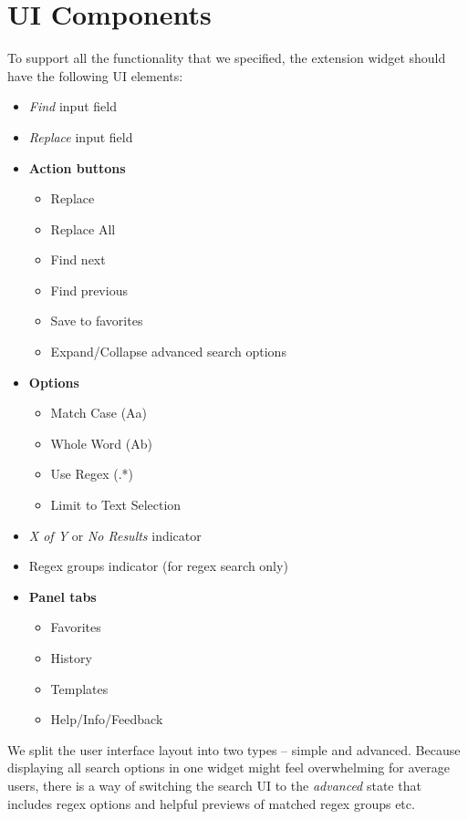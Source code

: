 \documentclass[bsc,frontabs,twoside,singlespacing,parskip,deptreport]{infthesis}
\providecommand{\tightlist}{%
  \setlength{\itemsep}{0pt}\setlength{\parskip}{0pt}}
\begin{document}
\section{UI Components}
To support all the functionality that we specified, the extension widget should have the following UI elements:
\begin{itemize}
\tightlist
\item
  \textit{Find} input field
\item
  \textit{Replace} input field
\item
  \textbf{Action buttons}

  \begin{itemize}
  \tightlist
  \item
    Replace
  \item
    Replace All
  \item
    Find next
  \item
    Find previous
  \item
    Save to favorites
  \item
  	Expand/Collapse advanced search options
  \end{itemize}
\item
  \textbf{Options}

  \begin{itemize}
  \tightlist
  \item
    Match Case (Aa)
  \item
    Whole Word (Ab\textbar{})
  \item
    Use Regex (.*)
  \item
    Limit to Text Selection
  \end{itemize}
\item
  \textit{X of Y} or \textit{No Results} indicator
\item
  Regex groups indicator (for regex search only)
\item
  \textbf{Panel tabs}

  \begin{itemize}
  \item
    Favorites
  \item
    History
  \item
    Templates
  \item
    Help/Info/Feedback
  \end{itemize}
\end{itemize}

We split the user interface layout into two types -- simple and advanced. Because displaying all search options in one widget might feel overwhelming for average users, there is a way of switching the search UI to the \textit{advanced} state that includes regex options and helpful previews of matched regex groups etc.
\end{document}

